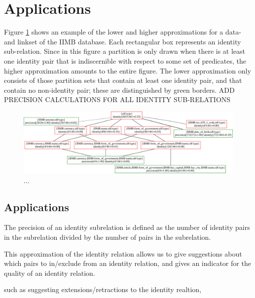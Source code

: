 \section{Applications}
\label{sec:applications}

Figure \ref{fig:ihierarchy} shows an example of the lower and higher
  approximations for a data- and linkset of the IIMB database.
Each rectangular box represents an identity sub-relation.
Since in this figure a partition is only drawn when there is at least one
  identity pair that is indiscernible with respect to some set of
  predicates, the higher approximation amounts to the entire figure.
The lower approximation only consists of those partition sets that contain
  at least one identity pair, and that contain no non-identity pair;
  these are distinguished by green borders.
ADD PRECISION CALCULATIONS FOR ALL IDENTITY SUB-RELATIONS

\begin{figure}[t]
\label{fig:ihierarchy}
\centering
\includegraphics[width=\textwidth]{./img/iimb_16}
\caption{...}
\end{figure}

\subsection{Applications}

The precision of an identity subrelation is defined as
    the number of identity pairs in the subrelation
  divided by
    the number of pairs in the subrelation.

This approximation of the identity relation allows us to
  give suggestions about which pairs to in/exclude from
  an identity relation, and
  gives an indicator for the quality of an identity relation.

  such as suggesting extensions/retractions to the identity realtion,

